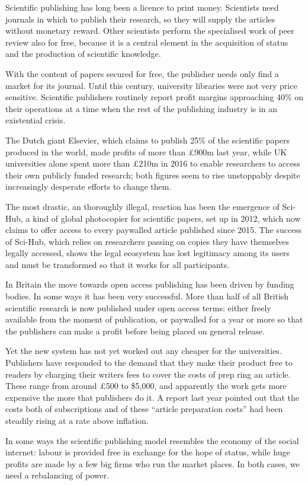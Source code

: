 Scientific publishing has long been a licence to print money. Scientists need journals in which to publish their research, so they will supply the articles without monetary reward. Other scientists perform the specialised work of peer review also  for free, because it is a central element in the acquisition of status and the production  of scientific knowledge.


With the content of papers secured for free, the publisher needs only find a market for its journal. Until this century, university libraries were not very price sensitive. Scientific publishers routinely report profit margins approaching 40\% on their operations at a time when the rest of the publishing industry is in an existential crisis.


The Dutch giant Elsevier, which claims to publish 25\% of the scientific papers produced in the world, made profits of more than £900m last year, while UK universities alone spent more than £210m in 2016 to enable researchers to access   their own publicly funded research; both figures seem to rise unstoppably despite increasingly desperate efforts to change them.


The most drastic, an thoroughly illegal, reaction has been the emergence of    Sci-Hub, a kind of global photocopier for scientific papers, set up in 2012, which now claims to offer access to every paywalled article published since 2015. The success of Sci-Hub, which relies on researchers passing on copies they have themselves legally accessed, shows the legal ecosystem has lost legitimacy among its users and must be transformed so that it works for all participants.


In Britain the move towards open access publishing has been driven by funding bodies. In some ways it has been very successful. More than half of all British  scientific research is now published under open access terms: either freely available from the moment of publication, or paywalled for a year or more so that the   publishers can make a profit before being placed on general release.


Yet the new system has not yet worked out any cheaper for the universities. Publishers have responded to the demand that they make their product free to readers  by charging their writers fees to cover the costs of prep ring an article. These range  from around £500 to \$5,000, and apparently the work gets more expensive the more that publishers do it. A report last year pointed out that the costs both of subscriptions and of these ``article preparation costs'' had been steadily rising at a rate above inflation.


In some ways the scientific publishing model resembles the economy of the   social internet: labour is provided free in exchange for the hope of status, while huge profits are made by a few big firms who run the market places. In both cases, we need  a rebalancing of power.
